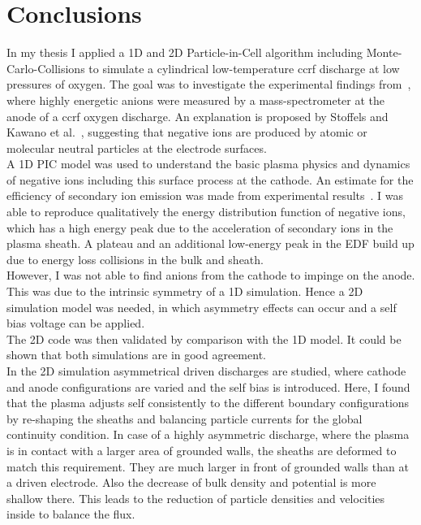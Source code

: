 %
\chapter*{Conclusions}\label{sec:chapter_conclusion}
%
%
%
%
    In my thesis I applied a 1D and 2D Particle-in-Cell algorithm including Monte-Carlo-Collisions to simulate a cylindrical low-temperature ccrf discharge at low pressures of oxygen. The goal was to investigate the experimental findings from~\cite{Scheuer15}, where highly energetic anions were measured by a mass-spectrometer at the anode of a ccrf oxygen discharge. An explanation is proposed by Stoffels and Kawano et al.~\cite{Stoffels01,Kawano83}, suggesting that negative ions are produced by atomic or molecular neutral particles at the electrode surfaces.\\
    A 1D PIC model was used to understand the basic plasma physics and dynamics of negative ions including this surface process at the cathode. An estimate for the efficiency of secondary ion emission was made from experimental results~\Cite{Meichsner13}. I was able to reproduce qualitatively the energy distribution function of negative ions, which has a high energy peak due to the acceleration of secondary ions in the plasma sheath. A plateau and an additional low-energy peak in the EDF build up due to energy loss collisions in the bulk and sheath.\\
    However, I was not able to find anions from the cathode to impinge on the anode. This was due to the intrinsic symmetry of a 1D simulation. Hence a 2D simulation model was needed, in which asymmetry effects can occur and a self bias voltage can be applied.\\
    The 2D code was then validated by comparison with the 1D model. It could be shown that both simulations are in good agreement.\\
   In the 2D simulation asymmetrical driven discharges are studied, where cathode and anode configurations are varied and the self bias is introduced. Here, I found that the plasma adjusts self consistently to the different boundary configurations by re-shaping the sheaths and balancing particle currents for the global continuity condition. In case of a highly asymmetric discharge, where the plasma is in contact with a larger area of grounded walls, the sheaths are deformed to match this requirement. They are much larger in front of grounded walls than at a driven electrode. Also the decrease of bulk density and potential is more shallow there. This leads to the reduction of particle densities and velocities inside to balance the flux.\\
